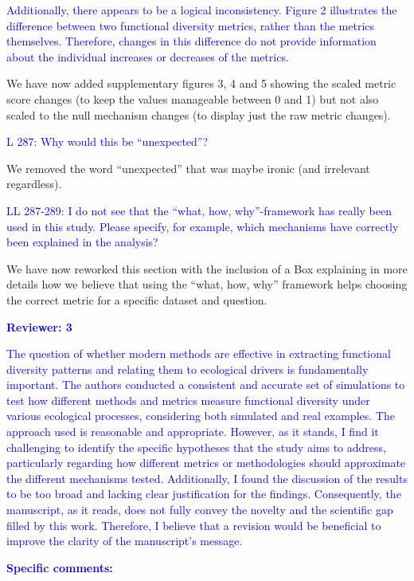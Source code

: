 \documentclass[
]{article}
\begin{document}
\textcolor{blue}{Additionally, there appears to be a logical inconsistency.
Figure 2 illustrates the difference between two functional diversity metrics, rather than the metrics themselves.
Therefore, changes in this difference do not provide information about the individual increases or decreases of the metrics.}

We have now added supplementary figures 3, 4 and 5 showing the scaled metric score changes (to keep the values manageable between 0 and 1) but not also scaled to the null mechanism changes (to display just the raw metric changes).

\textcolor{blue}{L 287: Why would this be ``unexpected''?}

We removed the word ``unexpected'' that was maybe ironic (and irrelevant regardless).

\textcolor{blue}{LL 287-289: I do not see that the ``what, how, why''-framework has really been used in this study.
Please specify, for example, which mechanisms have correctly been explained in the analysis?}

We have now reworked this section with the inclusion of a Box explaining in more details how we believe that using the ``what, how, why'' framework helps choosing the correct metric for a specific dataset and question.

\textcolor{blue}{\textbf{Reviewer: 3}}

\textcolor{blue}{The question of whether modern methods are effective in extracting functional diversity patterns and relating them to ecological drivers is fundamentally important.
The authors conducted a consistent and accurate set of simulations to test how different methods and metrics measure functional diversity under various ecological processes, considering both simulated and real examples.
The approach used is reasonable and appropriate.
However, as it stands, I find it challenging to identify the specific hypotheses that the study aims to address, particularly regarding how different metrics or methodologies should approximate the different mechanisms tested.
Additionally, I found the discussion of the results to be too broad and lacking clear justification for the findings.
Consequently, the manuscript, as it reads, does not fully convey the novelty and the scientific gap filled by this work.
Therefore, I believe that a revision would be beneficial to improve the clarity of the manuscript's message.}

\textcolor{blue}{\textbf{Specific comments:}}
\end{document}
